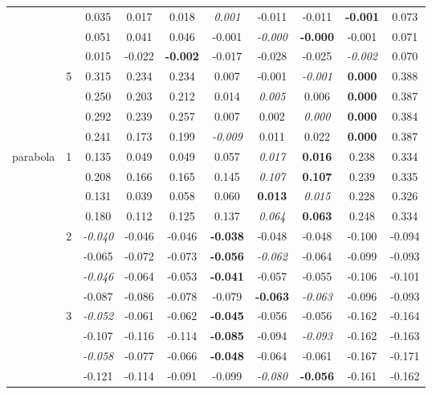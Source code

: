 \documentclass[authoryear, review, 11pt]{elsarticle}
\begin{document}
\begin{table}
\begin{center}
{\begin{tabular}{cccccccccc}
   &  & 0.035 & 0.017 & 0.018 & \emph{0.001} & -0.011 & -0.011 & \textbf{-0.001} & 0.073 \\ 
   &  & 0.051 & 0.041 & 0.046 & -0.001 & \emph{-0.000} & \textbf{-0.000} & -0.001 & 0.071 \\ 
   &  & 0.015 & -0.022 & \textbf{-0.002} & -0.017 & -0.028 & -0.025 & \emph{-0.002} & 0.070 \\ 
  \cline{3-10}
   & \multirow{4}{*}{5} & 0.315 & 0.234 & 0.234 & 0.007 & -0.001 & \emph{-0.001} & \textbf{0.000} & 0.388 \\ 
   &  & 0.250 & 0.203 & 0.212 & 0.014 & \emph{0.005} & 0.006 & \textbf{0.000} & 0.387 \\ 
   &  & 0.292 & 0.239 & 0.257 & 0.007 & 0.002 & \emph{0.000} & \textbf{0.000} & 0.384 \\ 
   &  & 0.241 & 0.173 & 0.199 & \emph{-0.009} & 0.011 & 0.022 & \textbf{0.000} & 0.387 \\ 
  \hline
  \multirow{20}{*}{parabola} & \multirow{4}{*}{1} & 0.135 & 0.049 & 0.049 & 0.057 & \emph{0.017} & \textbf{0.016} & 0.238 & 0.334 \\ 
   &  & 0.208 & 0.166 & 0.165 & 0.145 & \emph{0.107} & \textbf{0.107} & 0.239 & 0.335 \\ 
   &  & 0.131 & 0.039 & 0.058 & 0.060 & \textbf{0.013} & \emph{0.015} & 0.228 & 0.326 \\ 
   &  & 0.180 & 0.112 & 0.125 & 0.137 & \emph{0.064} & \textbf{0.063} & 0.248 & 0.334 \\ 
  \cline{3-10}
   & \multirow{4}{*}{2} & \emph{-0.040} & -0.046 & -0.046 & \textbf{-0.038} & -0.048 & -0.048 & -0.100 & -0.094 \\ 
   &  & -0.065 & -0.072 & -0.073 & \textbf{-0.056} & \emph{-0.062} & -0.064 & -0.099 & -0.093 \\ 
   &  & \emph{-0.046} & -0.064 & -0.053 & \textbf{-0.041} & -0.057 & -0.055 & -0.106 & -0.101 \\ 
   &  & -0.087 & -0.086 & -0.078 & -0.079 & \textbf{-0.063} & \emph{-0.063} & -0.096 & -0.093 \\ 
  \cline{3-10}
   & \multirow{4}{*}{3} & \emph{-0.052} & -0.061 & -0.062 & \textbf{-0.045} & -0.056 & -0.056 & -0.162 & -0.164 \\ 
   &  & -0.107 & -0.116 & -0.114 & \textbf{-0.085} & -0.094 & \emph{-0.093} & -0.162 & -0.163 \\ 
   &  & \emph{-0.058} & -0.077 & -0.066 & \textbf{-0.048} & -0.064 & -0.061 & -0.167 & -0.171 \\ 
   &  & -0.121 & -0.114 & -0.091 & -0.099 & \emph{-0.080} & \textbf{-0.056} & -0.161 & -0.162 \\ 

\end{tabular}}
\end{center}
\end{table}
\end{document}
